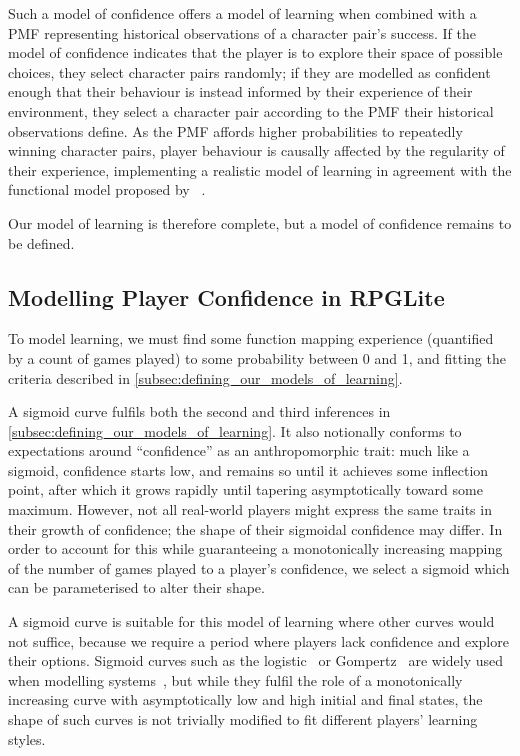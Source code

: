 Such a model of confidence offers a model of learning when combined with a PMF representing historical
observations of a character pair's success.
If the model of confidence indicates that the player is to explore their space of possible choices, they
select character pairs randomly; if they are modelled as confident enough that
their behaviour is instead informed by their experience of their environment,
they select a character pair according to the PMF their historical observations define.
As the PMF affords higher probabilities to repeatedly winning character pairs, player behaviour
is causally affected by the regularity of their experience, implementing a realistic model of learning
in agreement with the functional model proposed by \citeauthor{lachman1997learning}~\cite{lachman1997learning}.

Our model of learning is therefore complete, but a model of confidence remains to be defined.

\subsection{Modelling Player Confidence in RPGLite}\label{subsec:confidence_model}

To model learning, we must find some function mapping experience (quantified by
a count of games played) to some probability between 0 and 1, and fitting the
criteria described in \cref{subsec:defining_our_models_of_learning}.

A sigmoid curve fulfils both the second and third inferences in
\cref{subsec:defining_our_models_of_learning}. It also notionally conforms to
expectations around ``confidence'' as an anthropomorphic trait: much like a
sigmoid, confidence starts low, and remains so until it achieves some inflection
point, after which it grows rapidly until tapering asymptotically toward some
maximum. However, not all real-world players might express the same traits in
their growth of confidence; the shape of their sigmoidal confidence may differ.
In order to account for this while guaranteeing a monotonically increasing
mapping of the number of games played to a player's confidence, we select a
sigmoid which can be parameterised to alter their shape.

A sigmoid curve is suitable for this model of learning where other curves would
not suffice, because we require a period where players lack confidence and
explore their options. Sigmoid curves such as the
logistic~\cite{verhulst1845loi} or Gompertz~\cite{gompertz1815curve} are widely
used when modelling systems~\cite{werker1997modelling}, but while they fulfil
the role of a monotonically increasing curve with asymptotically low and high
initial and final states, the shape of such curves is not trivially modified to
fit different players' learning styles.

